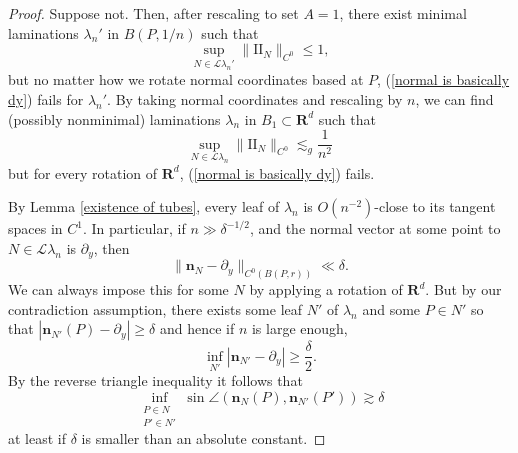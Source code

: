 \documentclass[final,12pt, leqno]{brownthesis}
\newcommand{\RR}{\mathbf{R}}
\newcommand{\Two}{\mathrm{I\!I}}
\newcommand{\Leaves}{\mathcal L}
\newcommand{\normal}{\mathbf n}
\newtheorem{sublemma}[theorem]{Sublemma}
\theoremstyle{definition}
\numberwithin{equation}{section}
\begin{document}
\begin{proof}
	Suppose not.
	Then, after rescaling to set $A = 1$, there exist minimal laminations $\lambda_n'$ in $B(P, 1/n)$ such that
	$$\sup_{N \in \Leaves \lambda_n'} \|\Two_N\|_{C^0} \leq 1,$$
	but no matter how we rotate normal coordinates based at $P$, (\ref{normal is basically dy}) fails for $\lambda_n'$.
	By taking normal coordinates and rescaling by $n$, we can find (possibly nonminimal) laminations $\lambda_n$ in $B_1 \subset \RR^d$ such that
\begin{equation}\label{bounds on Two in representation}
	\sup_{N \in \Leaves \lambda_n} \|\Two_N\|_{C^0} \lesssim_g \frac{1}{n^2}
\end{equation}
	but for every rotation of $\RR^d$, (\ref{normal is basically dy}) fails.



	By Lemma \ref{existence of tubes}, every leaf of $\lambda_n$ is $O(n^{-2})$-close to its tangent spaces in $C^1$.
	In particular, if $n \gg \delta^{-1/2}$, and the normal vector at some point to $N \in \Leaves \lambda_n$ is $\partial_y$, then
	$$\|\normal_N - \partial_y\|_{C^0(B(P, r))} \ll \delta.$$
	We can always impose this for some $N$ by applying a rotation of $\RR^d$.
	But by our contradiction assumption, there exists some leaf $N'$ of $\lambda_n$ and some $P \in N'$ so that $|\normal_{N'}(P) - \partial_y| \geq \delta$ and hence if $n$ is large enough,
	$$\inf_{N'} |\normal_{N'} - \partial_y| \geq \frac{\delta}{2}.$$
	By the reverse triangle inequality it follows that
\begin{equation}\label{discrepancy in normals}
	\inf_{\substack{P \in N\\ P' \in N'}} \sin \angle(\normal_N(P), \normal_{N'}(P')) \gtrsim \delta
\end{equation}
	at least if $\delta$ is smaller than an absolute constant.
	

\end{proof}
\end{document}
